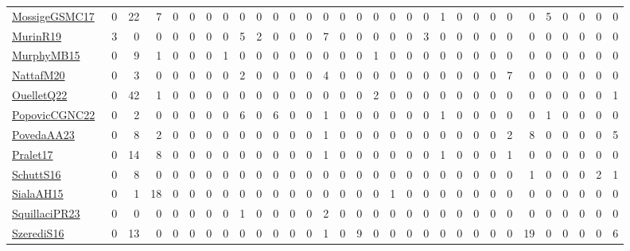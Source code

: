 \documentclass[a4paper]{article}
\begin{document}
{\begin{longtable}{l*{30}{r}}
\href{papers/MossigeGSMC17.pdf}{MossigeGSMC17}~\cite{MossigeGSMC17} & 0 & 22 & 7 & 0 & 0 & 0 & 0 & 0 & 0 & 0 & 0 & 0 & 0 & 0 & 0 & 0 & 0 & 0 & 0 & 1 & 0 & 0 & 0 & 0 & 0 & 5 & 0 & 0 & 0 & 0\\
\href{papers/MurinR19.pdf}{MurinR19}~\cite{MurinR19} & 3 & 0 & 0 & 0 & 0 & 0 & 0 & 5 & 2 & 0 & 0 & 0 & 7 & 0 & 0 & 0 & 0 & 0 & 3 & 0 & 0 & 0 & 0 & 0 & 0 & 0 & 0 & 0 & 0 & 0\\
\href{papers/MurphyMB15.pdf}{MurphyMB15}~\cite{MurphyMB15} & 0 & 9 & 1 & 0 & 0 & 0 & 1 & 0 & 0 & 0 & 0 & 0 & 0 & 0 & 0 & 1 & 0 & 0 & 0 & 0 & 0 & 0 & 0 & 0 & 0 & 0 & 0 & 0 & 0 & 0\\
\href{papers/NattafM20.pdf}{NattafM20}~\cite{NattafM20} & 0 & 3 & 0 & 0 & 0 & 0 & 0 & 2 & 0 & 0 & 0 & 0 & 4 & 0 & 0 & 0 & 0 & 0 & 0 & 0 & 0 & 0 & 0 & 7 & 0 & 0 & 0 & 0 & 0 & 0\\
\href{papers/OuelletQ22.pdf}{OuelletQ22}~\cite{OuelletQ22} & 0 & 42 & 1 & 0 & 0 & 0 & 0 & 0 & 0 & 0 & 0 & 0 & 0 & 0 & 0 & 2 & 0 & 0 & 0 & 0 & 0 & 0 & 0 & 0 & 0 & 0 & 0 & 0 & 0 & 1\\
\href{papers/PopovicCGNC22.pdf}{PopovicCGNC22}~\cite{PopovicCGNC22} & 0 & 2 & 0 & 0 & 0 & 0 & 0 & 6 & 0 & 6 & 0 & 0 & 1 & 0 & 0 & 0 & 0 & 0 & 0 & 1 & 0 & 0 & 0 & 0 & 0 & 1 & 0 & 0 & 0 & 0\\
\href{papers/PovedaAA23.pdf}{PovedaAA23}~\cite{PovedaAA23} & 0 & 8 & 2 & 0 & 0 & 0 & 0 & 0 & 0 & 0 & 0 & 0 & 1 & 0 & 0 & 0 & 0 & 0 & 0 & 0 & 0 & 0 & 0 & 2 & 8 & 0 & 0 & 0 & 0 & 5\\
\href{papers/Pralet17.pdf}{Pralet17}~\cite{Pralet17} & 0 & 14 & 8 & 0 & 0 & 0 & 0 & 0 & 0 & 0 & 0 & 0 & 1 & 0 & 0 & 0 & 0 & 0 & 0 & 1 & 0 & 0 & 0 & 1 & 0 & 0 & 0 & 0 & 0 & 0\\
\href{papers/SchuttS16.pdf}{SchuttS16}~\cite{SchuttS16} & 0 & 8 & 0 & 0 & 0 & 0 & 0 & 0 & 0 & 0 & 0 & 0 & 0 & 0 & 0 & 0 & 0 & 0 & 0 & 0 & 0 & 0 & 0 & 0 & 1 & 0 & 0 & 0 & 2 & 1\\
\href{papers/SialaAH15.pdf}{SialaAH15}~\cite{SialaAH15} & 0 & 1 & 18 & 0 & 0 & 0 & 0 & 0 & 0 & 0 & 0 & 0 & 0 & 0 & 0 & 0 & 1 & 0 & 0 & 0 & 0 & 0 & 0 & 0 & 0 & 0 & 0 & 0 & 0 & 0\\
\href{papers/SquillaciPR23.pdf}{SquillaciPR23}~\cite{SquillaciPR23} & 0 & 0 & 0 & 0 & 0 & 0 & 0 & 1 & 0 & 0 & 0 & 0 & 2 & 0 & 0 & 0 & 0 & 0 & 0 & 0 & 0 & 0 & 0 & 0 & 0 & 0 & 0 & 0 & 0 & 0\\
\href{papers/SzerediS16.pdf}{SzerediS16}~\cite{SzerediS16} & 0 & 13 & 0 & 0 & 0 & 0 & 0 & 0 & 0 & 0 & 0 & 0 & 1 & 0 & 9 & 0 & 0 & 0 & 0 & 0 & 0 & 0 & 0 & 0 & 19 & 0 & 0 & 0 & 0 & 6\\

\end{longtable}}
\end{document}
